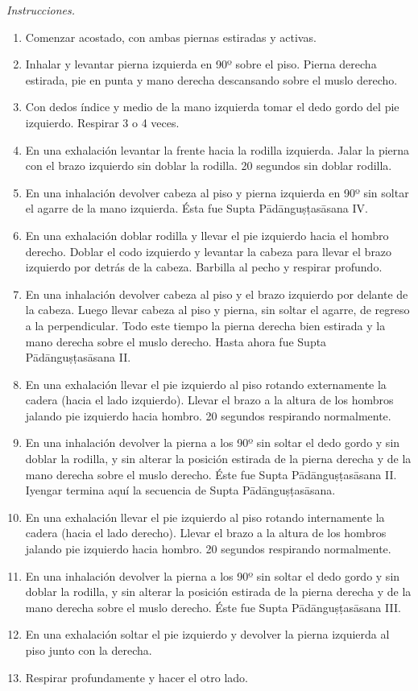 \emph{Instrucciones.}
\begin{enumerate}
\item Comenzar acostado, con ambas piernas
estiradas y activas.
\item Inhalar y levantar pierna izquierda en
90º sobre el piso. Pierna derecha estirada,
pie en punta y mano derecha descansando sobre
el muslo derecho.
\item Con dedos índice y medio de la mano
izquierda tomar el dedo gordo del pie
izquierdo. Respirar 3 o 4 veces.
\item En una exhalación levantar la frente
hacia la rodilla izquierda. Jalar la pierna
con el brazo izquierdo sin doblar la rodilla.
20 segundos sin doblar rodilla.
\item En una inhalación devolver cabeza al
piso y pierna izquierda en 90º sin soltar el
agarre de la mano izquierda. Ésta fue Supta
Pādānguṣṭasāsana IV.
\item En una exhalación doblar rodilla y
llevar el pie izquierdo hacia el hombro
derecho. Doblar el codo izquierdo y levantar
la cabeza para llevar el brazo izquierdo por
detrás de la cabeza. Barbilla al pecho y
respirar profundo.
\item En una inhalación devolver cabeza al
piso y el brazo izquierdo por delante de la
cabeza. Luego llevar cabeza al piso y pierna,
sin soltar el agarre, de regreso a la
perpendicular. Todo este tiempo la pierna
derecha bien estirada y la mano derecha sobre
el muslo derecho. Hasta ahora fue Supta
Pādānguṣṭasāsana II.
\item En una exhalación llevar el pie
izquierdo al piso rotando externamente la
cadera (hacia el lado izquierdo). Llevar el
brazo a la altura de los hombros jalando pie
izquierdo hacia hombro. 20 segundos
respirando normalmente.
\item En una inhalación devolver la pierna a
los 90º sin soltar el dedo gordo y sin doblar
la rodilla, y sin alterar la posición
estirada de la pierna derecha y de la mano
derecha sobre el muslo derecho. Éste fue
Supta Pādānguṣṭasāsana II. Iyengar termina
aquí la secuencia de Supta Pādānguṣṭasāsana.
\item En una exhalación llevar el pie
izquierdo al piso rotando internamente la
cadera (hacia el lado derecho). Llevar el
brazo a la altura de los hombros jalando pie
izquierdo hacia hombro. 20 segundos
respirando normalmente.
\item En una inhalación devolver la pierna a
los 90º sin soltar el dedo gordo y sin doblar
la rodilla, y sin alterar la posición
estirada de la pierna derecha y de la mano
derecha sobre el muslo derecho. Éste fue
Supta Pādānguṣṭasāsana III.
\item En una exhalación soltar el pie
izquierdo y devolver la pierna izquierda al
piso junto con la derecha.
\item Respirar profundamente y hacer el otro
lado.
\end{enumerate}

